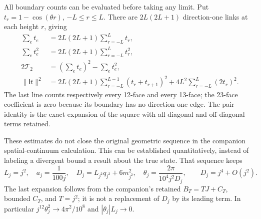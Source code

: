 \documentclass[
]{article}
\begin{document}
All boundary counts can be evaluated before taking any limit. Put
\(t_r=1-\cos(\theta r)\), \(-L\le r\le L\). There are \(2L(2L+1)\)
direction-one links at each height \(r\), giving \[
\begin{aligned}
\sum_et_e&=2L(2L+1)\sum_{r=-L}^Lt_r,\\
\sum_et_e^2&=2L(2L+1)\sum_{r=-L}^Lt_r^2,\\
2\mathcal T_2&=\left(\sum_et_e\right)^2-\sum_et_e^2,\\
\|\mathsf It\|^2
 &=2L(2L+1)\sum_{r=-L}^{L-1}(t_r+t_{r+1})^2
       +4L^2\sum_{r=-L}^L(2t_r)^2 .
\end{aligned}                                                   \tag{20.20}
\] The last line counts respectively every 12-face and every 13-face;
the 23-face coefficient is zero because its boundary has no
direction-one edge. The pair identity is the exact expansion of the
square with all diagonal and off-diagonal terms retained.

These estimates do not close the original geometric sequence in the
companion spatial-continuum calculation. This can be established
quantitatively, instead of labeling a divergent bound a result about the
true state. That sequence keeps \[
L_j=j^2,\quad a_j=\frac1{100j},\quad
D_j=L_{j^2}q_{j^2}+6m_{j^2}^2,\quad
\theta_j=\frac{2\pi}{10^4j^2D_j},\qquad D_j=j^4+O(j^2).
                                                               \tag{20.21}
\] The last expansion follows from the companion's retained
\(B_T=TJ+C_T\), bounded \(C_T\), and \(T=j^2\); it is not a replacement
of \(D_j\) by its leading term. In particular
\(j^{12}\theta_j^2\to4\pi^2/10^8\) and \(|\theta_j|L_j\to0\).
\end{document}
